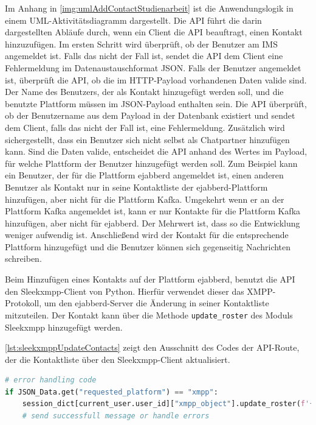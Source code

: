 \documentclass[a4paper,titlepage,halfparskip,12pt]{scrreprt}
\begin{document}
\begin{onehalfspacing}
Im Anhang in \autoref{img:umlAddContactStudienarbeit} ist die Anwendungslogik in einem \acs{UML}-Aktivitätsdiagramm dargestellt. Die \acs{API} führt die darin dargestellten Abläufe durch, wenn ein Client die \acs{API} beauftragt, einen Kontakt hinzuzufügen. Im ersten Schritt wird überprüft, ob der Benutzer am \acs{IMS} angemeldet ist. Falls das nicht der Fall ist, sendet die \acs{API} dem Client eine Fehlermeldung im Datenaustauschformat \acs{JSON}. Falls der Benutzer angemeldet ist, überprüft die \acs{API}, ob die im \acs{HTTP}-Payload vorhandenen Daten valide sind. Der Name des Benutzers, der als Kontakt hinzugefügt werden soll, und die benutzte Plattform müssen im \acs{JSON}-Payload enthalten sein. Die \acs{API} überprüft, ob der Benutzername aus dem Payload in der Datenbank existiert und sendet dem Client, falls das nicht der Fall ist, eine Fehlermeldung. Zusätzlich wird sichergestellt, dass ein Benutzer sich nicht selbst als Chatpartner hinzufügen kann. Sind die Daten valide, entscheidet die \acs{API} anhand des Wertes im Payload, für welche Plattform der Benutzer hinzugefügt werden soll. Zum Beispiel kann ein Benutzer, der für die Plattform ejabberd angemeldet ist, einen anderen Benutzer als Kontakt nur in seine Kontaktliste der ejabberd-Plattform hinzufügen, aber nicht für die Plattform Kafka. Umgekehrt wenn er an der Plattform Kafka angemeldet ist, kann er nur Kontakte für die Plattform Kafka hinzufügen, aber nicht für ejabberd. Der Mehrwert ist, dass so die Entwicklung weniger aufwendig ist. Anschließend wird der Kontakt für die entsprechende Plattform hinzugefügt und die Benutzer können sich gegenseitig Nachrichten schreiben.

Beim Hinzufügen eines Kontakts auf der Plattform ejabberd, benutzt die \acs{API} den Sleekxmpp-Client von Python. Hierfür verwendet dieser das \acs{XMPP}-Protokoll, um den ejabberd-Server die Änderung in seiner Kontaktliste mitzuteilen. Der Kontakt kann über die Methode \texttt{update\_roster} des Moduls Sleekxmpp hinzugefügt werden.

\autoref{lst:sleekxmppUpdateContacts} zeigt den Ausschnitt des Codes der \acs{API}-Route, der die Kontaktliste über den Sleekxmpp-Client aktualisiert.

\begin{lstlisting}[language=python, caption={Code für das Hinzufügen eines Kontakts über \acs{XMPP}}, label={lst:sleekxmppUpdateContacts}]
# error handling code
if JSON_Data.get("requested_platform") == "xmpp":
    session_dict[current_user.user_id]["xmpp_object"].update_roster(f'{user_name}@{config["ejabberd_domain"]}', name=user_name)
    # send successfull message or handle errors
\end{lstlisting}


\end{onehalfspacing}
\end{document}
